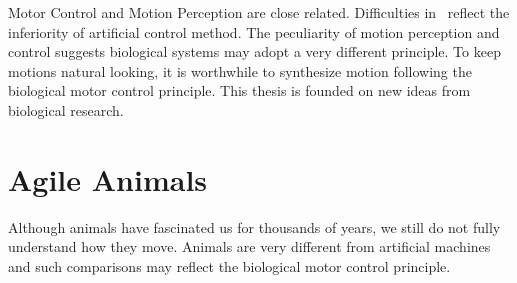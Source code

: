 Motor Control and Motion Perception are close related.
Difficulties in \cms\ reflect the inferiority of artificial control method.
The peculiarity of motion perception and control suggests  biological systems may adopt a very different principle.
To keep motions natural looking, it is worthwhile to synthesize motion following the biological motor control principle. 
This thesis is founded on new ideas from biological research.

 

\section{Agile Animals}
Although animals have fascinated us for thousands of years, we still do not fully understand how they move.
Animals are very different from artificial machines and such comparisons may reflect the  biological motor control principle.

